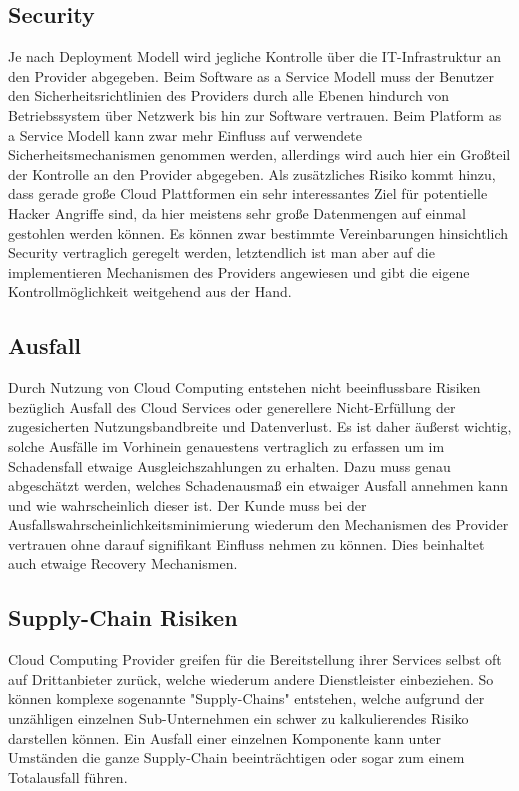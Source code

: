 \documentclass{report}
\begin{document}
\subsection{Security}
Je nach Deployment Modell wird jegliche Kontrolle über die IT-Infrastruktur an den Provider abgegeben. Beim Software as a Service Modell muss der Benutzer den Sicherheitsrichtlinien des Providers durch alle Ebenen hindurch von Betriebssystem über Netzwerk bis hin zur Software vertrauen. Beim Platform as a Service Modell kann zwar mehr Einfluss auf verwendete Sicherheitsmechanismen genommen werden, allerdings wird auch hier ein Großteil der Kontrolle an den Provider abgegeben. Als zusätzliches Risiko kommt hinzu, dass gerade große Cloud Plattformen ein sehr interessantes Ziel für potentielle Hacker Angriffe sind, da hier meistens sehr große Datenmengen auf einmal gestohlen werden können. Es können zwar bestimmte Vereinbarungen hinsichtlich Security vertraglich geregelt werden, letztendlich ist man aber auf die implementieren Mechanismen des Providers angewiesen und gibt die eigene Kontrollmöglichkeit weitgehend aus der Hand.  \cite{bro2008} 

\subsection{Ausfall}
Durch Nutzung von Cloud Computing entstehen nicht beeinflussbare Risiken bezüglich Ausfall des Cloud Services oder generellere Nicht-Erfüllung der zugesicherten Nutzungsbandbreite und Datenverlust. Es ist daher äußerst wichtig, solche Ausfälle im Vorhinein genauestens vertraglich zu erfassen um im Schadensfall etwaige Ausgleichszahlungen zu erhalten. Dazu muss genau abgeschätzt werden, welches Schadenausmaß ein etwaiger Ausfall annehmen kann und wie wahrscheinlich dieser ist. Der Kunde muss bei der Ausfallswahrscheinlichkeitsminimierung wiederum den Mechanismen des Provider vertrauen ohne darauf signifikant Einfluss nehmen zu können. Dies beinhaltet auch etwaige Recovery Mechanismen.  

\subsection{Supply-Chain Risiken}
Cloud Computing Provider greifen für die Bereitstellung ihrer Services selbst oft auf Drittanbieter zurück, welche wiederum andere Dienstleister einbeziehen. So können komplexe sogenannte "Supply-Chains" entstehen, welche aufgrund der unzähligen einzelnen Sub-Unternehmen ein schwer zu kalkulierendes Risiko darstellen können. Ein Ausfall einer einzelnen Komponente kann unter Umständen die ganze Supply-Chain beeinträchtigen oder sogar zum einem Totalausfall führen.  \cite{haa2013}
\end{document}
